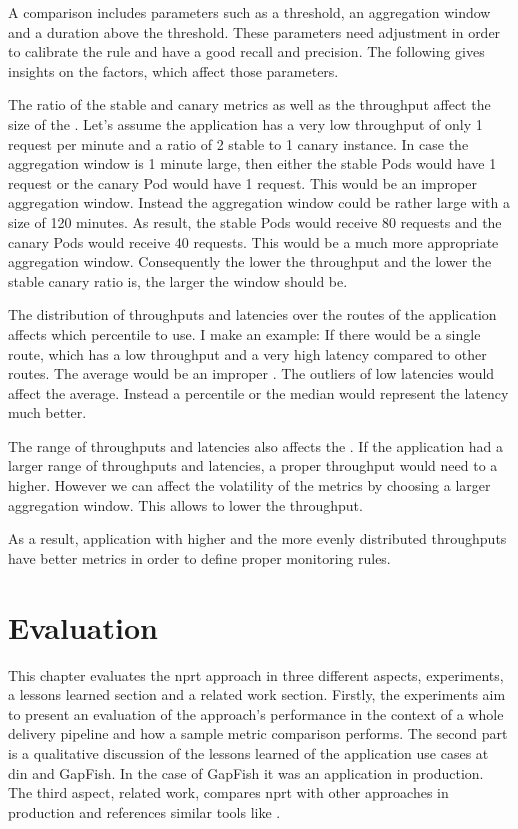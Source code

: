 A comparison includes parameters such as a threshold, an aggregation window and a duration
above the threshold. These parameters need adjustment in order to calibrate the rule and
have a good recall and precision. The following gives insights on the factors, which
affect those parameters.

The ratio of the stable and canary metrics as well as the throughput affect the size of
the . Let's assume the application has a very low throughput of
only 1 request per minute and a ratio of 2 stable to 1 canary instance. In case the
aggregation window is 1 minute large, then either the stable Pods would have 1 request or
the canary Pod would have 1 request. This would be an improper aggregation window. Instead
the aggregation window could be rather large with a size of 120 minutes. As result, the
stable Pods would receive 80 requests and the canary Pods would receive 40 requests. This
would be a much more appropriate aggregation window. Consequently the lower the throughput
and the lower the stable canary ratio is, the larger the window should be.

The distribution of throughputs and latencies over the routes of the application affects
which percentile to use. I make an example: If there would be a single route, which has a
low throughput and a very high latency compared to other routes. The average would be an
improper . The outliers of low latencies would affect the
average. Instead a percentile or the median would represent the latency much better.

The range of throughputs and latencies also affects the . If the
application had a larger range of throughputs and latencies, a proper throughput would
need to a higher. However we can affect the volatility of the metrics by choosing a larger
aggregation window. This allows to lower the throughput.

As a result, application with higher and the more evenly distributed throughputs have
better metrics in order to define proper monitoring rules.

\chapter{Evaluation}
\label{chap:eval}

This chapter evaluates the \gls{nprt} approach in three different aspects, experiments, a
lessons learned section and a related work section. Firstly, the experiments aim to
present an evaluation of the approach's performance in the context of a whole delivery
pipeline and how a sample metric comparison performs. The second part is a qualitative
discussion of the lessons learned of the application use cases at \gls{din} and GapFish.
In the case of GapFish it was an application in production. The third aspect, related work,
compares \gls{nprt} with other approaches in production and references similar tools like
\deployer.

